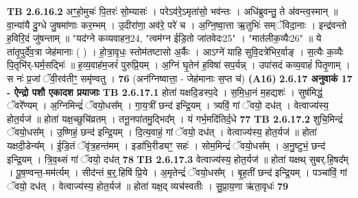 \documentclass[17pt]{extarticle}
\begin{document}
                  \newline
                                \textbf{ TB 2.6.16.2} \newline
                  अꣳ॒॒हो॒मुचः॑ पि॒तरः॑ सो॒म्यासः॑ । परेऽव॑रे॒ऽमृता॑सो॒ भव॑न्तः । अधि॑ब्रुवन्तु॒ ते अ॑वन्त्व॒स्मान् ॥ वा॒न्या॑यै दु॒ग्धे जु॒षमा॑णाः कर॒म्भम् । उ॒दीरा॑णा॒ अव॑रे॒ परे॑ च । अ॒ग्नि॒ष्वा॒त्ता ऋ॒तुभिः॑ सम्ॅविदा॒नाः । इन्द्र॑वन्तो ह॒विरि॒दं जु॑षन्ताम् ॥ "यद॑ग्ने कव्यवाहन॒{24}, "त्वम॑ग्न ईडि॒तो जा॑तवेदः{25}" । "मात॑लीक॒व्यैः{26}" ॥ ये ता॑तृ॒पुर्दे॑व॒त्रा जेह॑मानाः ( ) । हो॒त्रा॒वृधः॒ स्तोम॑तष्टासो अ॒र्कैः । आऽग्ने॑ याहि सुवि॒दत्रे॑भिर॒र्वाङ् । स॒त्यैः क॒व्यैः पि॒तृभि॑र्-घर्म॒सद्भिः॑ ॥ ह॒व्य॒वाह॑म॒जरं॑ पुरुप्रि॒यम् । अ॒ग्निं घृ॒तेन॑ ह॒विषा॑ सप॒र्यन्न् । उपा॑सदं कव्य॒वाहं॑ पितृ॒णाम् । स नः॑ प्र॒जां ॅवी॒रव॑तीꣳ॒॒ समृ॑ण्वतु । \textbf{ 76} \newline
                  \newline
                                    (अन॑ग्निष्वात्ता॒ - जेह॑मानाः स॒प्त च॑) \textbf{(A16)} \newline \newline
                \textbf{ 2.6.17    अनुवाकं   17 - ऐन्द्रो पशौ एकादश प्रयाजाः} \newline
                                \textbf{ TB 2.6.17.1} \newline
                  होता॑ यक्षदि॒डस्प॒दे । स॒मि॒धा॒नं म॒हद्यशः॑ । सुष॑मिद्धं॒ ॅवरे᳚ण्यम् । अ॒ग्निमिन्द्रं॑ ॅवयो॒धस᳚म् । गा॒य॒त्रीं छन्द॑ इन्द्रि॒यम् । त्र्यविं॒ गां ॅवयो॒ दध॑त् । वेत्वाज्य॑स्य॒ होत॒र्यज॑ ॥ होता॑ यक्ष॒च्छुचि॑व्रतम् । तनू॒नपा॑तमु॒द्भिद᳚म् । यं गर्भ॒मदि॑तिर्द॒धे \textbf{ 77} \newline
                  \newline
                                \textbf{ TB 2.6.17.2} \newline
                  शुचि॒मिन्द्रं॑ ॅवयो॒धस᳚म् । उ॒ष्णिहं॒ छन्द॑ इन्द्रि॒यम् । दि॒त्य॒वाहं॒ गां ॅवयो॒ दध॑त् । वेत्वाज्य॑स्य॒ होत॒र्यज॑ ॥ होता॑ यक्षदी॒डेन्य᳚म् । ई॒डि॒तं ॅवृ॑त्र॒हन्त॑मम् । इडा॑भि॒रीड्यꣳ॒॒ सहः॑ । सोम॒मिन्द्रं॑ ॅवयो॒धस᳚म् । अ॒नु॒ष्टुभं॒ छन्द॑ इन्द्रि॒यम् । त्रि॒व॒थ्सं गां ॅवयो॒ दध॑त् \textbf{ 78} \newline
                  \newline
                                \textbf{ TB 2.6.17.3} \newline
                  वेत्वाज्य॑स्य॒ होत॒र्यज॑ ॥ होता॑ यक्षथ् सुबर्.हि॒षद᳚म् । पू॒ष॒ण्वन्त॒-मम॑र्त्यम् । सीद॑न्तं ब॒र्॒.हिषि॑ प्रि॒ये । अ॒मृतेन्द्रं॑ ॅवयो॒धस᳚म् । बृ॒ह॒तीं छन्द॑ इन्द्रि॒यम् । पञ्चा॑विं॒ गां ॅवयो॒ दध॑त् । वेत्वाज्य॑स्य॒ होत॒र्यज॑ ॥ होता॑ यक्ष॒द् व्यच॑स्वतीः । सु॒प्रा॒य॒णा ऋ॑ता॒वृधः॑ \textbf{ 79} \newline
\end{document}
